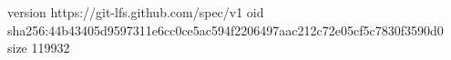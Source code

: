 version https://git-lfs.github.com/spec/v1
oid sha256:44b43405d9597311e6cc0ce5ac594f2206497aac212c72e05cf5c7830f3590d0
size 119932

